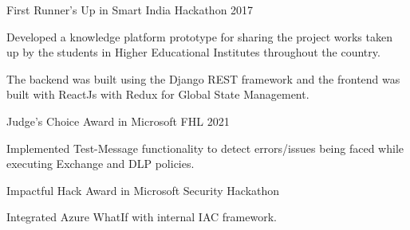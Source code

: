 
\begin{cventries}
  \cventry
    {} %
    {First Runner's Up in Smart India Hackathon 2017} %
    {} %
    {} %
    {
      \begin{cvitems} %
        \item {Developed a knowledge platform prototype for sharing the project works taken up by the students in Higher Educational Institutes throughout the country.}
        \item {The backend was built using the Django REST framework and the frontend was built with ReactJs with Redux for Global State Management.}
      \end{cvitems}
    }
    \cventry
    {} %
    {Judge's Choice Award in Microsoft FHL 2021} %
    {} %
    {}
    {
        \begin{cvitems}
            \item {Implemented Test-Message functionality to detect errors/issues being faced while executing Exchange and DLP policies.}
        \end{cvitems}
    }
    \cventry
    {}
    {Impactful Hack Award in Microsoft Security Hackathon}
    {}
    {}
    {
        \begin{cvitems}
            \item {Integrated Azure WhatIf with internal IAC framework.}
        \end{cvitems}
    }
\end{cventries}
